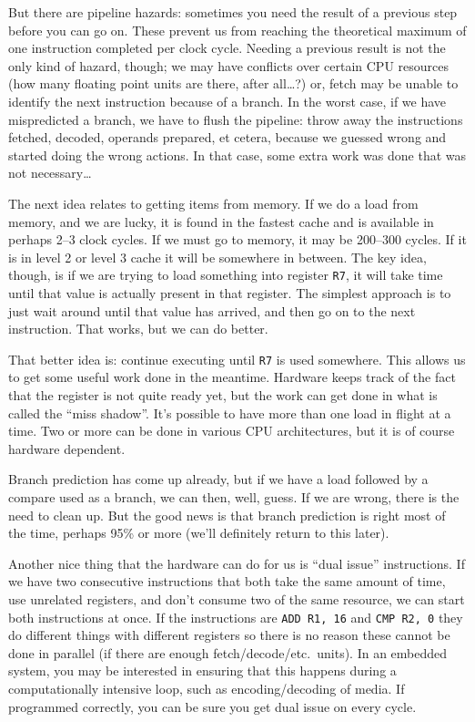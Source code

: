 But there are pipeline hazards: sometimes you need the result of a previous step before you can go on. These prevent us from reaching the theoretical maximum of one instruction completed per clock cycle. Needing a previous result is not the only kind of hazard, though; we may have conflicts over certain CPU resources (how many floating point units are there, after all\ldots?) or, fetch may be unable to identify the next instruction because of a branch. In the worst case, if we have mispredicted a branch, we have to flush the pipeline: throw away the instructions fetched, decoded, operands prepared, et cetera, because we guessed wrong and started doing the wrong actions. In that case, some extra work was done that was not necessary\ldots

The next idea relates to getting items from memory. If we do a load from memory, and we are lucky, it is found in the fastest cache and is available in perhaps 2--3 clock cycles. If we must go to memory, it may be 200--300 cycles. If it is in level 2 or level 3 cache it will be somewhere in between. The key idea, though, is if we are trying to load something into register \texttt{R7}, it will take time until that value is actually present in that register. The simplest approach is to just wait around until that value has arrived, and then go on to the next instruction. That works, but we can do better.

That better idea is: continue executing until \texttt{R7} is used somewhere. This allows us to get some useful work done in the meantime. Hardware keeps track of the fact that the register is not quite ready yet, but the work can get done in what is called the ``miss shadow''. It's possible to have more than one load in flight at a time. Two or more can be done in various CPU architectures, but it is of course hardware dependent. 

Branch prediction has come up already, but if we have a load followed by a compare used as a branch, we can then, well, guess. If we are wrong, there is the need to clean up. But the good news is that branch prediction is right most of the time, perhaps 95\% or more (we'll definitely return to this later).

Another nice thing that the hardware can do for us is ``dual issue'' instructions. If we have two consecutive instructions that both take the same amount of time, use unrelated registers, and don't consume two of the same resource, we can start both instructions at once. If the instructions are \texttt{ADD R1, 16} and \texttt{CMP R2, 0} they do different things with different registers so there is no reason these cannot be done in parallel (if there are enough fetch/decode/etc.\ units). In an embedded system, you may be interested in ensuring that this happens during a computationally intensive loop, such as encoding/decoding of media. If programmed correctly, you can be sure you get dual issue on every cycle.

